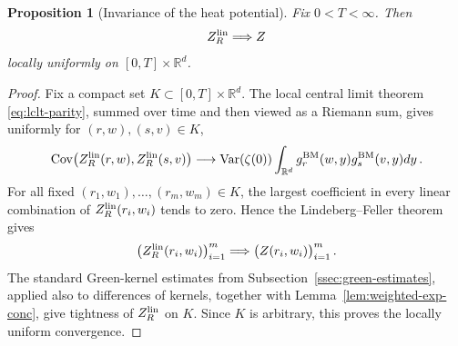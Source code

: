 \documentclass[11pt]{amsart}
\theoremstyle{plain}
\newtheorem{proposition}[theorem]{Proposition}
\theoremstyle{definition}
\newcommand{\R}{\mathbb{R}}
\DeclareMathOperator{\Var}{Var}
\DeclareMathOperator{\Cov}{Cov}
\begin{document}
	\begin{proposition}[Invariance of the heat potential]
	\label{prop:dlt4-heat-potential-invariance}
		Fix $0<T<\infty$. Then
		\[
			Z_R^{\rm lin}\Longrightarrow Z
		\]
		locally uniformly on $[0,T]\times\R^d$.
	\end{proposition}
	\begin{proof}
		Fix a compact set $K\subset[0,T]\times\R^d$. The local central limit theorem \eqref{eq:lclt-parity}, summed over time and then viewed as a
		Riemann sum, gives
		uniformly for $(r,w),(s,v)\in K$,
		\[
			\Cov\bigl(Z_R^{\rm lin}(r,w),Z_R^{\rm lin}(s,v)\bigr)
			\longrightarrow
			\Var(\zeta(0))
			\int_{\R^d}g_r^{\rm BM}(w,y)g_s^{\rm BM}(v,y)dy \, .
		\]
		For all fixed $(r_1,w_1),\ldots,(r_m,w_m)\in K$, the largest coefficient
		in every linear combination of
		$Z_R^{\rm lin}(r_i,w_i)$ tends to zero. Hence the Lindeberg--Feller  theorem gives
		\[
			\bigl(Z_R^{\rm lin}(r_i,w_i)\bigr)_{i=1}^m
			\Longrightarrow
			\bigl(Z(r_i,w_i)\bigr)_{i=1}^m \, .
		\]
		The standard Green-kernel estimates from
		Subsection~\ref{ssec:green-estimates}, applied also to differences of
		kernels, together with Lemma~\ref{lem:weighted-exp-conc}, give tightness
		of $Z_R^{\rm lin}$ on $K$. Since $K$ is arbitrary, this proves the
		locally uniform convergence.
	\end{proof}
\end{document}
